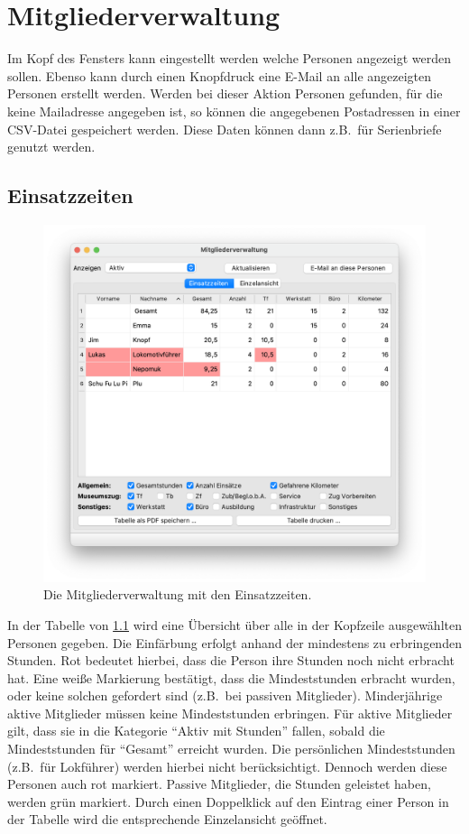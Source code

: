 \chapter{Mitgliederverwaltung}\label{einsatz:personal}
Im Kopf des Fensters kann eingestellt werden welche Personen angezeigt werden sollen.
Ebenso kann durch einen Knopfdruck eine E-Mail an alle angezeigten Personen erstellt werden.
Werden bei dieser Aktion Personen gefunden, für die keine Mailadresse angegeben ist,
so können die angegebenen Postadressen in einer CSV-Datei gespeichert werden.
Diese Daten können dann z.B.\ für Serienbriefe genutzt werden.

\section{Einsatzzeiten}\label{einsatz:personal:zeiten}
\begin{figure}[!h]
	\includegraphics[width=\textwidth]{img/personal_gesamt}
	\caption{Die Mitgliederverwaltung mit den Einsatzzeiten.}
	\label{fig:einsatz:personal:zeiten}
\end{figure}
In der Tabelle von \cref{fig:einsatz:personal:zeiten} wird eine Übersicht über alle in der Kopfzeile ausgewählten Personen gegeben.
Die Einfärbung erfolgt anhand der mindestens zu erbringenden Stunden.
Rot bedeutet hierbei, dass die Person ihre Stunden noch nicht erbracht hat.
Eine weiße Markierung bestätigt, dass die Mindeststunden erbracht wurden, oder keine solchen gefordert sind (z.B.\ bei passiven Mitglieder).
Minderjährige aktive Mitglieder müssen keine Mindeststunden erbringen.
Für aktive Mitglieder gilt, dass sie in die Kategorie "`Aktiv mit Stunden"' fallen, sobald die Mindeststunden für "`Gesamt"' erreicht wurden.
Die persönlichen Mindeststunden (z.B.\ für Lokführer)
werden hierbei nicht berücksichtigt.
Dennoch werden diese Personen auch rot markiert.
Passive Mitglieder, die Stunden geleistet haben, werden grün markiert.
Durch einen Doppelklick auf den Eintrag einer Person in der Tabelle wird die entsprechende Einzelansicht geöffnet.


